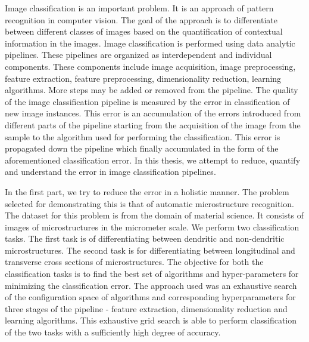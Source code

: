 
Image classification is an important problem. It is an approach of pattern recognition in computer vision. The goal of the approach is to differentiate between different classes of images based on the quantification of contextual information in the images. Image classification is performed using data analytic pipelines. These pipelines are organized as interdependent and individual components. These components include image acquisition, image preprocessing, feature extraction, feature preprocessing, dimensionality reduction, learning algorithms. More steps may be added or removed from the pipeline. The quality of the image classification pipeline is measured by the error in classification of new image instances. This error is an accumulation of the errors introduced from different parts of the pipeline starting from the acquisition of the image from the sample to the algorithm used for performing the  classification. This error is propagated down the pipeline which finally accumulated in the form of the aforementioned classification error. In this thesis, we attempt to reduce, quantify and understand the error in image classification pipelines.   

In the first part, we try to reduce the error in a holistic manner. The problem selected for demonstrating this is that of automatic microstructure recognition. The dataset for this problem is from the domain of material science. It consists of images of microstructures in the micrometer scale. We perform two classification tasks. The first task is of differentiating between dendritic and non-dendritic microstructures. The second task is for differentiating between longitudinal and transverse cross sections of microstructures. The objective for both the classification tasks is to find the best set of algorithms and hyper-parameters for minimizing the classification error. The approach used was an exhaustive search of the configuration space of algorithms and corresponding hyperparameters for three stages of the pipeline - feature extraction, dimensionality reduction and learning algorithms. This exhaustive grid search is able to perform classification of the two tasks with a sufficiently high degree of accuracy.


